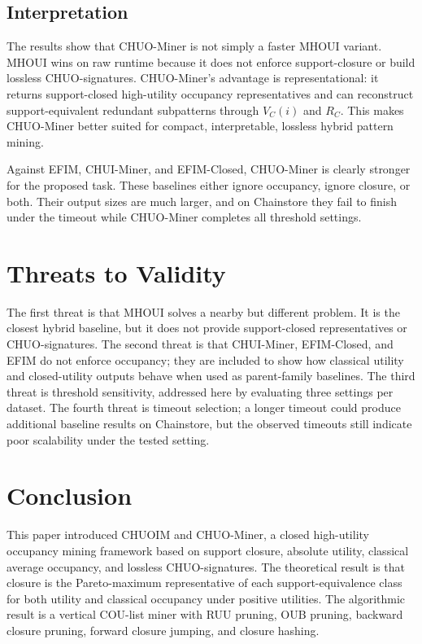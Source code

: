 \documentclass[11pt,a4paper]{article}
\begin{document}
\subsection{Interpretation}

The results show that CHUO-Miner is not simply a faster MHOUI variant. MHOUI wins on raw runtime because it does not enforce support-closure or build lossless CHUO-signatures. CHUO-Miner's advantage is representational: it returns support-closed high-utility occupancy representatives and can reconstruct support-equivalent redundant subpatterns through \(V_C(i)\) and \(R_C\). This makes CHUO-Miner better suited for compact, interpretable, lossless hybrid pattern mining.

Against EFIM, CHUI-Miner, and EFIM-Closed, CHUO-Miner is clearly stronger for the proposed task. These baselines either ignore occupancy, ignore closure, or both. Their output sizes are much larger, and on Chainstore they fail to finish under the timeout while CHUO-Miner completes all threshold settings.

\section{Threats to Validity}

The first threat is that MHOUI solves a nearby but different problem. It is the closest hybrid baseline, but it does not provide support-closed representatives or CHUO-signatures. The second threat is that CHUI-Miner, EFIM-Closed, and EFIM do not enforce occupancy; they are included to show how classical utility and closed-utility outputs behave when used as parent-family baselines. The third threat is threshold sensitivity, addressed here by evaluating three settings per dataset. The fourth threat is timeout selection; a longer timeout could produce additional baseline results on Chainstore, but the observed timeouts still indicate poor scalability under the tested setting.

\section{Conclusion}

This paper introduced CHUOIM and CHUO-Miner, a closed high-utility occupancy mining framework based on support closure, absolute utility, classical average occupancy, and lossless CHUO-signatures. The theoretical result is that closure is the Pareto-maximum representative of each support-equivalence class for both utility and classical occupancy under positive utilities. The algorithmic result is a vertical COU-list miner with RUU pruning, OUB pruning, backward closure pruning, forward closure jumping, and closure hashing.
\end{document}
